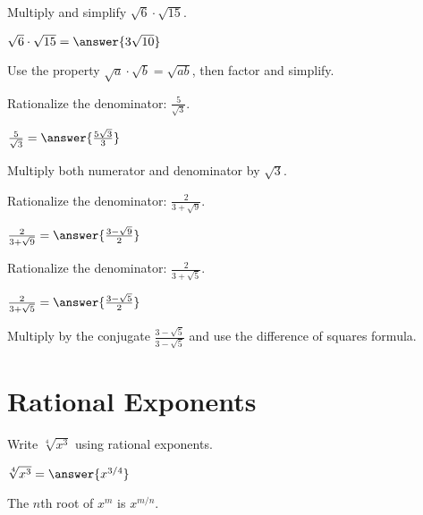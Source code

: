 \documentclass{ximera}
\begin{document}
\begin{problem}
Multiply and simplify $\sqrt{6} \cdot \sqrt{15}$.

$\sqrt{6} \cdot \sqrt{15} = \answer{3\sqrt{10}}$

\begin{hint}
Use the property $\sqrt{a} \cdot \sqrt{b} = \sqrt{ab}$, then factor and simplify.
\end{hint}
\end{problem}

\begin{problem}
Rationalize the denominator: $\frac{5}{\sqrt{3}}$.

$\frac{5}{\sqrt{3}} = \answer{\frac{5\sqrt{3}}{3}}$

\begin{hint}
Multiply both numerator and denominator by $\sqrt{3}$.
\end{hint}
\end{problem}



\begin{problem}
Rationalize the denominator: $\frac{2}{3 + \sqrt{9}}$.

$\frac{2}{3 + \sqrt{9}} = \answer{\frac{3 - \sqrt{9}}{2}}$
\end{problem}

\begin{problem}
Rationalize the denominator: $\frac{2}{3 + \sqrt{5}}$.

$\frac{2}{3 + \sqrt{5}} = \answer{\frac{3 - \sqrt{5}}{2}}$


\begin{hint}
Multiply by the conjugate $\frac{3 - \sqrt{5}}{3 - \sqrt{5}}$ and use the difference of squares formula.
\end{hint}
\end{problem}

\section{Rational Exponents}

\begin{problem}
Write $\sqrt[4]{x^3}$ using rational exponents.

$\sqrt[4]{x^3} = \answer{x^{3/4}}$

\begin{hint}
The $n$th root of $x^m$ is $x^{m/n}$.
\end{hint}
\end{problem}
\end{document}
